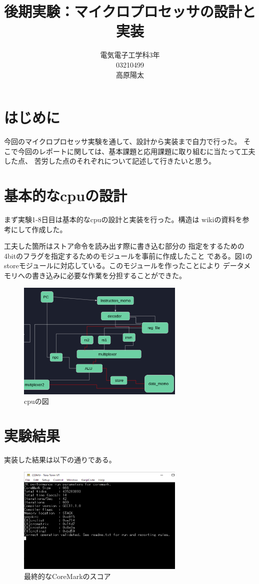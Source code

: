 \documentclass[12pt]{jreport}
\title{後期実験：マイクロプロセッサの設計と実装}
\author{電気電子工学科3年\\03210499\\高原陽太}
\begin{document}
  \maketitle
  \section{はじめに}

  今回のマイクロプロセッサ実験を通して、設計から実装まで自力で行った。
  そこで今回のレポートに関しては、基本課題と応用課題に取り組むに当たって工夫した点、
  苦労した点のそれぞれについて記述して行きたいと思う。
  
  \section{基本的なcpuの設計}

  まず実験1-8日目は基本的なcpuの設計と実装を行った。構造は
  wikiの資料を参考にして作成した。
  
  工夫した箇所はストア命令を読み出す際に書き込む部分の
  指定をするための4bitのフラグを指定するためのモジュールを事前に作成したこと
  である。図1のstoreモジュールに対応している。このモジュールを作ったことにより
  データメモリへの書き込みに必要な作業を分担することができた。
  \begin{figure}[htbp]
    \centering
    \includegraphics[width=8cm]{picture/cpu.png}
    \caption{cpuの図}
  \end{figure}

  
  \section{実験結果}
  実装した結果は以下の通りである。
  \begin{figure}[htbp]
    \centering
    \includegraphics[width=8cm]{picture/score.png}
    \caption{最終的なCoreMarkのスコア}
  \end{figure}
\end{document}
